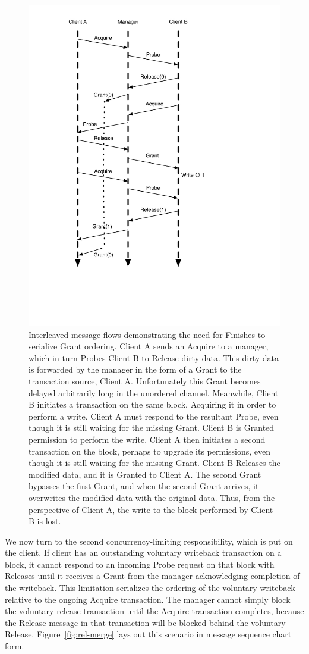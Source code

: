 \begin{figure}[t!]
\centering
\includegraphics[width=0.5\columnwidth]{tilelink/figures/unordered.pdf}
\caption{Interleaved message flows demonstrating the need for Finishes to serialize Grant ordering.
Client A sends an Acquire to a manager, which in turn Probes Client B to Release dirty data.
This dirty data is forwarded by the manager in the form of a Grant to the transaction source, Client A.
Unfortunately this Grant becomes delayed arbitrarily long in the unordered channel. 
Meanwhile, Client B initiates a transaction on the same block, Acquiring it in order to perform a write.
Client A must respond to the resultant Probe, even though it is still waiting for the missing Grant.
Client B is Granted permission to perform the write.
Client A then initiates a second transaction on the block, perhaps to upgrade its permissions, even though it is still waiting for the missing Grant.
Client B Releases the modified data, and it is Granted to Client A.
The second Grant bypasses the first Grant, and when the second Grant arrives, it overwrites the modified data with the original data.
Thus, from the perspective of Client A, the write to the block performed by Client B is lost.
}
\label{fig:unordered}
\end{figure}

We now turn to the second concurrency-limiting responsibility, which is put on the client.
If client has an outstanding voluntary writeback transaction on a block,
it cannot respond to an incoming Probe request on that block with Releases until it receives a Grant from the manager acknowledging completion of the writeback.
This limitation serializes the ordering of the voluntary writeback relative to the ongoing Acquire transaction.
The manager cannot simply block the voluntary release transaction until the Acquire transaction completes, because the Release message in that transaction will be
blocked behind the voluntary Release.
Figure~\ref{fig:rel-merge} lays out this scenario in message sequence chart form.

